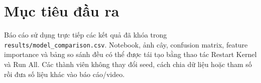 \section{Mục tiêu đầu ra}

Báo cáo sử dụng trực tiếp các kết quả đã khóa trong
\texttt{results/model\_comparison.csv}. Notebook, ảnh cây, confusion matrix,
feature importance và bảng so sánh đều có thể được tái tạo bằng thao tác
Restart Kernel và Run All. Các thành viên không thay đổi seed, cách chia dữ
liệu hoặc tham số rồi đưa số liệu khác vào báo cáo/video.
